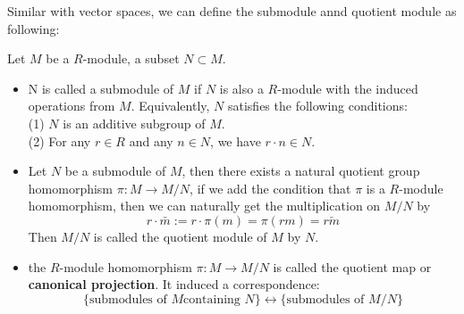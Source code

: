 \documentclass[12pt,a4paper]{article}
\begin{document}
Similar with vector spaces, we can define the submodule annd quotient module as following:
\begin{definitionplain}
    Let \(M\) be a \(R\)-module, a subset \(N \subset M\).
    \begin{itemize}
        \item N is called a submodule of \(M\) if \(N\) is also a \(R\)-module with the induced operations from \(M\). Equivalently, \(N\) satisfies the following conditions:\\
        (1) \(N\) is an additive subgroup of \(M\).\\
        (2) For any \(r \in R\) and any \(n \in N\), we have \(r \cdot n \in N\).

        \item Let \(N\) be a submodule of \(M\), then there exists a natural quotient group homomorphism \(\pi: M \to M/N\), if we add the condition that \(\pi\) is a \(R\)-module homomorphism, then we can naturally get the multiplication on \(M/N\) by
        \[r \cdot \bar{m} := r \cdot \pi(m) = \pi(rm) = \bar{rm}\]
        Then \(M/N\) is called the quotient module of \(M\) by \(N\).

        \item the \(R\)-module homomorphism \(\pi: M \to M/N\) is called the quotient map or \textbf{canonical projection}. It induced a correspondence:
        \[\{\text{submodules of } M  \text{containing } N\} \leftrightarrow \{\text{submodules  of } M/N\}\]
    \end{itemize}

\end{definitionplain}
\end{document}

